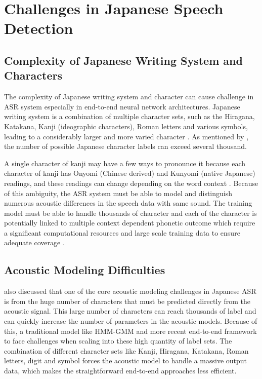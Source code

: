 \section{Challenges in Japanese Speech Detection}
\subsection{Complexity of Japanese Writing System and Characters}
The complexity of Japanese writing system and character can cause challenge in ASR system especially in end-to-end neural network architectures. Japanese writing system is a combination of multiple character sets, such as the Hiragana, Katakana, Kanji (ideographic characters), Roman letters and various symbols, leading to a considerably larger and more varied character \parencite{rose2019unique}. As mentioned by \textcite{Ito2016End-to-end,ito2017}, the number of possible Japanese character labels can exceed several thousand.

A single character of kanji may have a few ways to pronounce it because each character of kanji has Onyomi (Chinese derived) and Kunyomi (native Japanese) readings, and these readings can change depending on the word context \parencite{curtin2020japanese}. Because of this ambiguity, the ASR system must be able to model and distinguish numerous acoustic differences in the speech data with same sound. The training model must be able to handle thousands of character and each of the character is potentially linked to multiple context dependent phonetic outcome which require a significant computational resources and large scale training data to ensure adequate coverage \parencite{Ito2016End-to-end,ito2017}.


\subsection{Acoustic Modeling Difficulties}
\textcite{ito2017} also discussed that one of the core acoustic modeling challenges in Japanese ASR is from the huge number of characters that must be predicted directly from the acoustic signal. This large number of characters can reach thousands of label and can quickly increase the number of parameters in the acoustic models. Because of this, a traditional model like HMM-GMM and more recent end-to-end framework to face challenges when scaling into these high quantity of label sets. The combination of different character sets like Kanji, Hiragana, Katakana, Roman letters, digit and symbol forces the acoustic model to handle a massive output data, which makes the straightforward end-to-end approaches less efficient\parencite{glasmachers17a}. 

